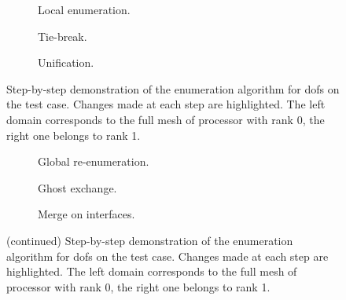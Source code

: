 {%
\let\oldthesubfigure\thesubfigure
\renewcommand{\thesubfigure}{Phase \arabic{subfigure}}

\def\Length{1}
\def\Radius{0.03}

%
%

\begin{figure}
\centering
\begin{subfigure}{\textwidth}
  \resizebox{\textwidth}{!}{
    
    \hfill{}
    
  }
  \caption{Local enumeration.}
\end{subfigure}
\begin{subfigure}{\textwidth}
  \resizebox{\textwidth}{!}{
    
    \hfill{}
    
  }
  \caption{Tie-break.}
\end{subfigure}
\begin{subfigure}{\textwidth}
  \resizebox{\textwidth}{!}{
    
    \hfill{}
    
  }
  \caption{Unification.}
\end{subfigure}
\caption[Step-by-step demonstration of the enumeration algorithm for \glspl{dof} on the test case.]{Step-by-step demonstration of the enumeration algorithm for \glspl{dof} on the test case. Changes made at each step are highlighted. The left domain corresponds to the full mesh of processor with rank 0, the right one belongs to rank 1.}
\label{fig:enumdemosteps}
\end{figure}

\begin{figure}
\ContinuedFloat
\begin{subfigure}{\textwidth}
  \resizebox{\textwidth}{!}{
    
    \hfill{}
    
  }
  \caption{Global re-enumeration.}
\end{subfigure}
\begin{subfigure}{\textwidth}
  \resizebox{\textwidth}{!}{
    
    \hfill{}
    
  }
  \caption{Ghost exchange.}
\end{subfigure}
\begin{subfigure}{\textwidth}
  \resizebox{\textwidth}{!}{
    
    \hfill{}
    
  }
  \caption{Merge on interfaces.}
\end{subfigure}
\caption[]{(continued) Step-by-step demonstration of the enumeration algorithm for \glspl{dof} on the test case. Changes made at each step are highlighted. The left domain corresponds to the full mesh of processor with rank 0, the right one belongs to rank 1.}
\end{figure}

\renewcommand{\thesubfigure}{\oldthesubfigure}
}
